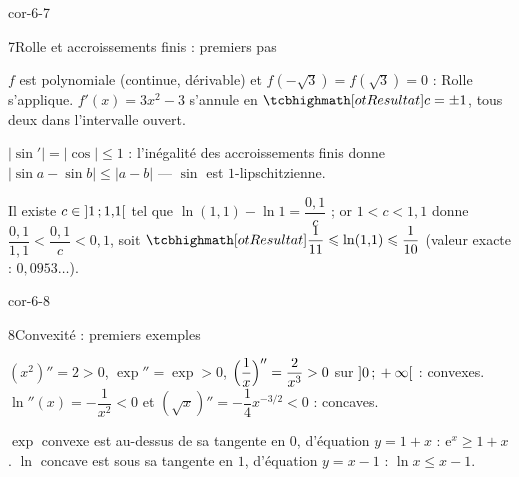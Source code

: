 \begin{blocLivre}{cor-6-7}
\begin{corrige}{7}{Rolle et accroissements finis : premiers pas}
\begin{questions}
  \item $f$ est polynomiale (continue, dérivable) et
    $f(-\sqrt3)=f(\sqrt3)=0$ : Rolle s'applique. $f'(x)=3x^{2}-3$ s'annule
    en $\res{c=\pm1}$, tous deux dans l'intervalle ouvert.
  \item $|\sin'|=|\cos|\leq1$ : l'inégalité des accroissements finis donne
    $|\sin a-\sin b|\leq|a-b|$ — $\sin$ est $1$-lipschitzienne.
  \item Il existe $c\in\mathopen{]}1\,{;}\,1{,}1\mathclose{[}$ tel que
    $\ln(1{,}1)-\ln1=\dfrac{0{,}1}{c}$ ; or $1<c<1{,}1$ donne
    $\dfrac{0{,}1}{1{,}1}<\dfrac{0{,}1}{c}<0{,}1$, soit
    $\res{\dfrac{1}{11}\leq\ln(1{,}1)\leq\dfrac{1}{10}}$
    (valeur exacte : $0{,}0953\dots$).
\end{questions}
\end{corrige}
\end{blocLivre}

\begin{blocLivre}{cor-6-8}
\begin{corrige}{8}{Convexité : premiers exemples}
\begin{questions}
  \item $(x^{2})''=2>0$, $\exp''=\exp>0$,
    $\Bigl(\dfrac1x\Bigr)''=\dfrac{2}{x^{3}}>0$ sur $\mathopen{]}0\,{;}\,+\infty\mathclose{[}$ :
    convexes. $\ln''(x)=-\dfrac{1}{x^{2}}<0$ et
    $(\sqrt x)''=-\dfrac{1}{4}x^{-3/2}<0$ : concaves.
  \item $\exp$ convexe est au-dessus de sa tangente en $0$, d'équation
    $y=1+x$ : $\mathrm{e}^{x}\geq1+x$. $\ln$ concave est sous sa tangente
    en $1$, d'équation $y=x-1$ : $\ln x\leq x-1$.
\end{questions}
\end{corrige}
\end{blocLivre}

